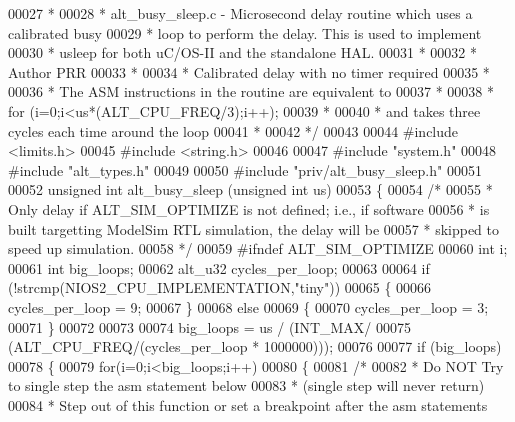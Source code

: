 \begin{DoxyCode}
00027 \textcolor{comment}{ *}
00028 \textcolor{comment}{ * alt\_busy\_sleep.c - Microsecond delay routine which uses a calibrated busy}
00029 \textcolor{comment}{ *                    loop to perform the delay. This is used to implement}
00030 \textcolor{comment}{ *                    usleep for both uC/OS-II and the standalone HAL.  }
00031 \textcolor{comment}{ *}
00032 \textcolor{comment}{ * Author PRR}
00033 \textcolor{comment}{ *}
00034 \textcolor{comment}{ * Calibrated delay with no timer required}
00035 \textcolor{comment}{ * }
00036 \textcolor{comment}{ * The ASM instructions in the routine are equivalent to }
00037 \textcolor{comment}{ *}
00038 \textcolor{comment}{ * for (i=0;i<us*(ALT\_CPU\_FREQ/3);i++);}
00039 \textcolor{comment}{ * }
00040 \textcolor{comment}{ * and takes three cycles each time around the loop}
00041 \textcolor{comment}{ *}
00042 \textcolor{comment}{ */}
00043 
00044 \textcolor{preprocessor}{#include <limits.h>}
00045 \textcolor{preprocessor}{#include <string.h>}
00046 
00047 \textcolor{preprocessor}{#include "system.h"}
00048 \textcolor{preprocessor}{#include "alt_types.h"}
00049 
00050 \textcolor{preprocessor}{#include "priv/alt_busy_sleep.h"}
00051 
00052 \textcolor{keywordtype}{unsigned} \textcolor{keywordtype}{int} alt_busy_sleep (\textcolor{keywordtype}{unsigned} \textcolor{keywordtype}{int} us)
00053 \{
00054 \textcolor{comment}{/*}
00055 \textcolor{comment}{ * Only delay if ALT\_SIM\_OPTIMIZE is not defined; i.e., if software}
00056 \textcolor{comment}{ * is built targetting ModelSim RTL simulation, the delay will be}
00057 \textcolor{comment}{ * skipped to speed up simulation.}
00058 \textcolor{comment}{ */}
00059 \textcolor{preprocessor}{#ifndef ALT\_SIM\_OPTIMIZE}
00060   \textcolor{keywordtype}{int} i;
00061   \textcolor{keywordtype}{int} big\_loops;
00062   alt_u32 cycles\_per\_loop;
00063   
00064   \textcolor{keywordflow}{if} (!strcmp(NIOS2_CPU_IMPLEMENTATION,\textcolor{stringliteral}{"tiny"}))
00065   \{
00066     cycles\_per\_loop = 9;
00067   \}
00068   \textcolor{keywordflow}{else}  
00069   \{
00070     cycles\_per\_loop = 3;
00071   \}
00072   
00073 
00074   big\_loops = us / (INT\_MAX/
00075   (ALT_CPU_FREQ/(cycles\_per\_loop * 1000000)));
00076 
00077   \textcolor{keywordflow}{if} (big\_loops)
00078   \{
00079     \textcolor{keywordflow}{for}(i=0;i<big\_loops;i++)
00080     \{
00081       \textcolor{comment}{/*}
00082 \textcolor{comment}{      * Do NOT Try to single step the asm statement below }
00083 \textcolor{comment}{      * (single step will never return)}
00084 \textcolor{comment}{      * Step out of this function or set a breakpoint after the asm statements}

\end{DoxyCode}
